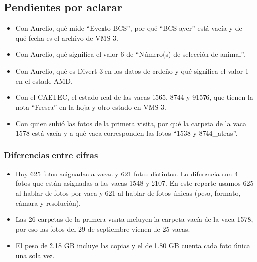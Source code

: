 \subsection{Pendientes por aclarar}

\begin{itemize}
  \item Con Aurelio, qué mide ``Evento BCS'', por qué ``BCS ayer'' está vacía y de qué fecha es el archivo de VMS 3.
  \item Con Aurelio, qué significa el valor 6 de ``Número(s) de selección de animal''.
  \item Con Aurelio, qué es Divert 3 en los datos de ordeño y qué significa el valor 1 en el estado AMD.
  \item Con el CAETEC, el estado real de las vacas 1565, 8744 y 91576, que tienen la nota ``Fresca'' en la hoja y otro estado en VMS 3.
  \item Con quien subió las fotos de la primera visita, por qué la carpeta de la vaca 1578 está vacía y a qué vaca corresponden las fotos ``1538 y 8744\_atras''.
\end{itemize}

\subsubsection*{Diferencias entre cifras}

\begin{itemize}
  \item Hay 625 fotos asignadas a vacas y 621 fotos distintas. La diferencia son 4 fotos que están asignadas a las vacas 1548 y 2107. En este reporte usamos 625 al hablar de fotos por vaca y 621 al hablar de fotos únicas (peso, formato, cámara y resolución).
  \item Las 26 carpetas de la primera visita incluyen la carpeta vacía de la vaca 1578, por eso las fotos del 29 de septiembre vienen de 25 vacas.
  \item El peso de 2.18 GB incluye las copias y el de 1.80 GB cuenta cada foto única una sola vez.
\end{itemize}
